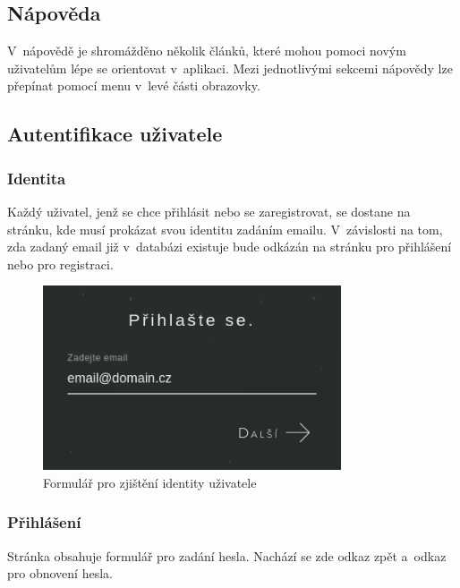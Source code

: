 \documentclass[a4paper,12pt]{article}
\begin{document}
\subsection{Nápověda}

V~nápovědě je shromážděno několik článků, které mohou pomoci novým uživatelům lépe se orientovat v~aplikaci. Mezi jednotlivými sekcemi nápovědy lze přepínat pomocí menu v~levé části obrazovky.

\subsection{Autentifikace uživatele}

\subsubsection{Identita}

Každý uživatel, jenž se chce přihlásit nebo se zaregistrovat, se dostane na stránku, kde musí prokázat svou identitu zadáním emailu. V~závislosti na tom, zda zadaný email již v~databázi existuje bude odkázán na stránku pro přihlášení nebo pro registraci.

\begin{figure}[H]
\begin{center}
\includegraphics[width=250pt]{Images/Identity.png}
\caption{Formulář pro zjištění identity uživatele}
\label{Identity}
\end{center}
\end{figure}

\subsubsection{Přihlášení}

Stránka obsahuje formulář pro zadání hesla. Nachází se zde odkaz zpět a~odkaz pro obnovení hesla.
\end{document}
